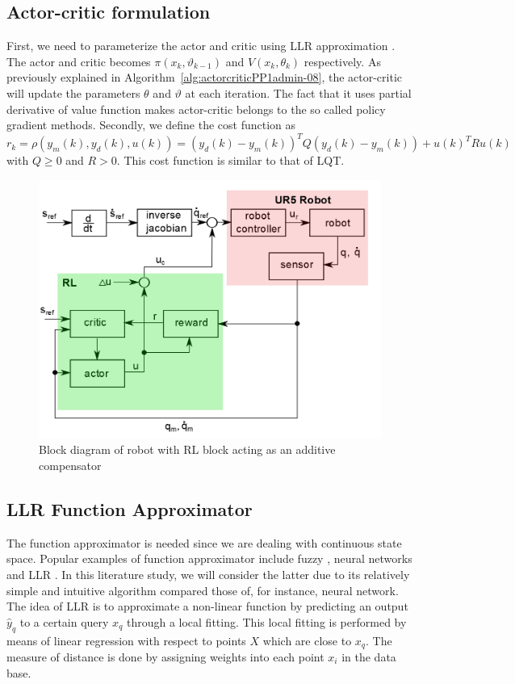 \subsection{Actor-critic formulation}
First, we need to parameterize the actor and critic using \ac {LLR} approximation \cite{Grondman6096441}. The actor and critic becomes $\pi(x_k,\vartheta_{k-1})$ and $V(x_k,\theta_k)$ respectively. As previously explained in Algorithm~\ref{alg:actorcriticPP1admin-08}, the actor-critic will update the parameters $\theta$ and $\vartheta$ at each iteration. The fact that it uses partial derivative of value function makes actor-critic belongs to the so called policy gradient methods. Secondly, we define the cost function as
\begin{equation}
r_k = \rho(y_m(k), y_d(k), u(k)) = (y_d(k) - y_m(k))^TQ(y_d(k) - y_m(k)) + u(k)^TRu(k)
\end{equation}
with $ Q \geq 0 $ and $ R>0 $. This cost function is similar to that of \ac {LQT}. 


\begin{figure}[h]
	\centering
	\includegraphics[width=0.7\linewidth]{blockdiagram}
	\caption{Block diagram of robot with \ac{RL} block acting as an additive compensator}
	\label{fig:blockdiagram}
\end{figure}

\subsection{\ac{LLR} Function Approximator}
The function approximator is needed since we are dealing with continuous state space. Popular examples of function approximator include fuzzy \cite{Efe2014}, neural networks \cite{Kiumarsi6918527} and \ac {LLR} \cite{Grondman6096441}. In this literature study, we will consider the latter due to its relatively simple and intuitive algorithm compared those of, for instance, neural network. The idea of \ac {LLR} is to approximate a non-linear function by predicting an output $\hat{y}_q$ to a certain query $x_q$ through a local fitting. This local fitting is performed by means of linear regression with respect to points $X$ which are close to $x_q$.  
The measure of distance is done by assigning weights into each point $x_i$ in the data base. 

